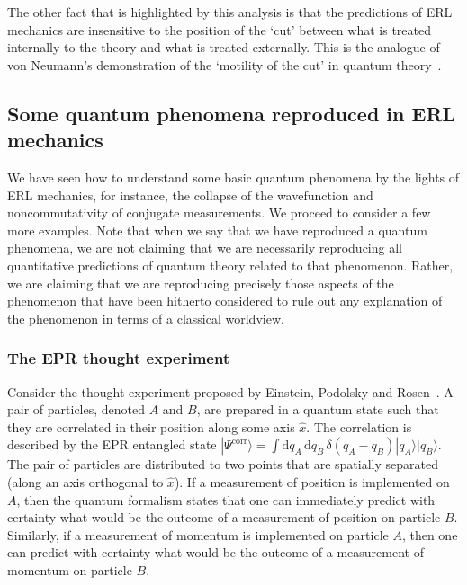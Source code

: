 \documentclass[pra,superscriptaddress,nofootinbib,12pt]{revtex4-2}
\begin{document}
The other fact that is highlighted by this analysis is that the predictions of ERL mechanics are insensitive to the position of the `cut' between what is treated internally to the theory and what is treated externally.  This is the analogue of von Neumann's demonstration of the `motility of the cut' in quantum theory~\cite{JvNtext}.

\subsection{Some quantum phenomena reproduced in ERL mechanics}
\label{sec:phenomena}

We have seen how to understand some basic quantum phenomena by the lights of ERL mechanics, for instance, the collapse of the wavefunction and noncommutativity of conjugate measurements.  We proceed to consider a few more examples.  Note that when we say that we have reproduced a quantum phenomena, we are not claiming that we are necessarily reproducing all quantitative
predictions of quantum theory related to that phenomenon.  Rather, we are claiming that we are reproducing precisely those aspects of the phenomenon that have been hitherto considered to rule out any explanation of the phenomenon in terms of a classical worldview.

\subsubsection{The EPR thought experiment}
\label{sec:EPR}

Consider the thought experiment proposed by Einstein, Podolsky and Rosen~\cite{EPR35}.  A pair of particles, denoted $A$ and $B$, are prepared in a quantum state such that they are correlated in their position along some axis $\hat{x}$. The correlation is described by the EPR entangled state $|\Psi^{\textrm{corr}}\rangle = \int \textrm{d}q_A\,\textrm{d}q_B\,\delta(q_A-q_B)|q_A\rangle|q_B\rangle$.  The pair of particles are distributed to two points that are spatially separated (along an axis orthogonal to $\hat{x}$).
If a measurement of position is implemented on $A$, then the quantum formalism states that one can immediately predict with certainty what would be the outcome of a measurement of position on particle $B$.  Similarly, if a measurement of momentum is implemented on particle $A$, then one can predict with certainty what would be the outcome of a measurement of momentum on particle $B$.
\end{document}
